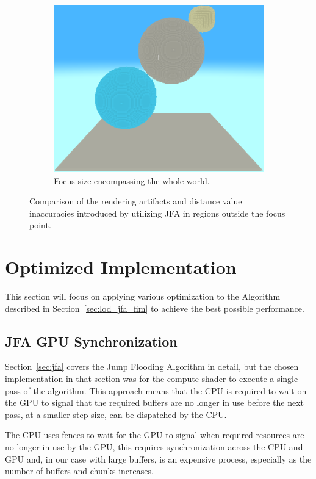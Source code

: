 \begin{figure}[htbp]
    \begin{subfigure}[t]{0.32\textwidth}
        \centering
        \includegraphics[width=\textwidth]{figures/hybrid_focus_3.png}
        \caption{Focus size encompassing the whole world.}
    \end{subfigure}
    \caption{Comparison of the rendering artifacts and distance value inaccuracies introduced by utilizing JFA in regions
        outside the focus point.}
    \label{fig:focus_size_artifacts}
\end{figure}

\section{Optimized Implementation}
This section will focus on applying various optimization to the Algorithm described in Section~\ref{sec:lod_jfa_fim} to
achieve the best possible performance.

\subsection{JFA GPU Synchronization} \label{sec:jfa_gpu}
Section~\ref{sec:jfa} covers the Jump Flooding Algorithm in detail, but the chosen implementation in that section was for
the compute shader to execute a single pass of the algorithm. This approach means that the CPU is required to wait on the
GPU to signal that the required buffers are no longer in use before the next pass, at a smaller step size, can be
dispatched by the CPU.

The CPU uses fences to wait for the GPU to signal when required resources are no longer in use by the GPU, this requires
synchronization across the CPU and GPU and, in our case with large buffers, is an expensive process, especially as the
number of buffers and chunks increases.


